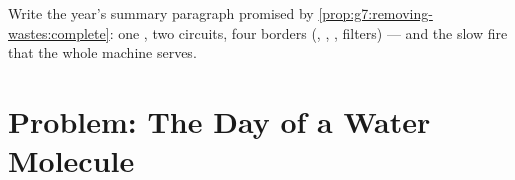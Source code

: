 \begin{exercise}[$\star\star\star$]\label{exo:g7:removing-wastes:12}
Write the year's summary paragraph promised by
\cref{prop:g7:removing-wastes:complete}: one , two
circuits, four borders (, , 
,  filters) --- and the slow fire that
the whole machine serves.
\end{exercise}

\section{Problem: The Day of a Water Molecule}

